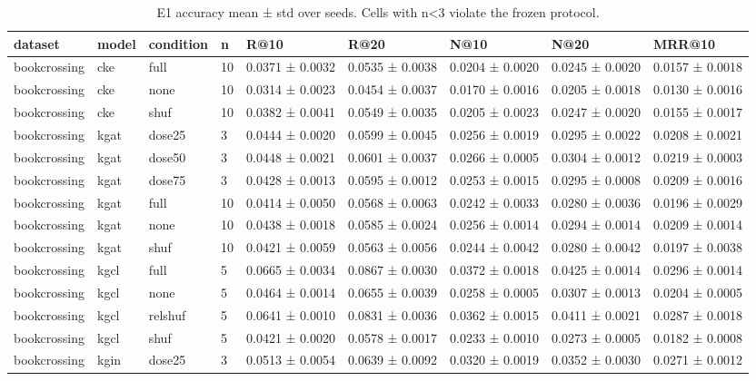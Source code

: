 \begin{table}[t]
\centering
\caption{E1 accuracy mean ± std over seeds. Cells with n<3 violate the frozen protocol.}
\label{tab:e1}
\begin{tabular}{lllllllll}
\hline
dataset & model & condition & n & R@10 & R@20 & N@10 & N@20 & MRR@10 \\
\hline
bookcrossing & cke & full & 10 & 0.0371 ± 0.0032 & 0.0535 ± 0.0038 & 0.0204 ± 0.0020 & 0.0245 ± 0.0020 & 0.0157 ± 0.0018 \\
bookcrossing & cke & none & 10 & 0.0314 ± 0.0023 & 0.0454 ± 0.0037 & 0.0170 ± 0.0016 & 0.0205 ± 0.0018 & 0.0130 ± 0.0016 \\
bookcrossing & cke & shuf & 10 & 0.0382 ± 0.0041 & 0.0549 ± 0.0035 & 0.0205 ± 0.0023 & 0.0247 ± 0.0020 & 0.0155 ± 0.0017 \\
bookcrossing & kgat & dose25 & 3 & 0.0444 ± 0.0020 & 0.0599 ± 0.0045 & 0.0256 ± 0.0019 & 0.0295 ± 0.0022 & 0.0208 ± 0.0021 \\
bookcrossing & kgat & dose50 & 3 & 0.0448 ± 0.0021 & 0.0601 ± 0.0037 & 0.0266 ± 0.0005 & 0.0304 ± 0.0012 & 0.0219 ± 0.0003 \\
bookcrossing & kgat & dose75 & 3 & 0.0428 ± 0.0013 & 0.0595 ± 0.0012 & 0.0253 ± 0.0015 & 0.0295 ± 0.0008 & 0.0209 ± 0.0016 \\
bookcrossing & kgat & full & 10 & 0.0414 ± 0.0050 & 0.0568 ± 0.0063 & 0.0242 ± 0.0033 & 0.0280 ± 0.0036 & 0.0196 ± 0.0029 \\
bookcrossing & kgat & none & 10 & 0.0438 ± 0.0018 & 0.0585 ± 0.0024 & 0.0256 ± 0.0014 & 0.0294 ± 0.0014 & 0.0209 ± 0.0014 \\
bookcrossing & kgat & shuf & 10 & 0.0421 ± 0.0059 & 0.0563 ± 0.0056 & 0.0244 ± 0.0042 & 0.0280 ± 0.0042 & 0.0197 ± 0.0038 \\
bookcrossing & kgcl & full & 5 & 0.0665 ± 0.0034 & 0.0867 ± 0.0030 & 0.0372 ± 0.0018 & 0.0425 ± 0.0014 & 0.0296 ± 0.0014 \\
bookcrossing & kgcl & none & 5 & 0.0464 ± 0.0014 & 0.0655 ± 0.0039 & 0.0258 ± 0.0005 & 0.0307 ± 0.0013 & 0.0204 ± 0.0005 \\
bookcrossing & kgcl & relshuf & 5 & 0.0641 ± 0.0010 & 0.0831 ± 0.0036 & 0.0362 ± 0.0015 & 0.0411 ± 0.0021 & 0.0287 ± 0.0018 \\
bookcrossing & kgcl & shuf & 5 & 0.0421 ± 0.0020 & 0.0578 ± 0.0017 & 0.0233 ± 0.0010 & 0.0273 ± 0.0005 & 0.0182 ± 0.0008 \\
bookcrossing & kgin & dose25 & 3 & 0.0513 ± 0.0054 & 0.0639 ± 0.0092 & 0.0320 ± 0.0019 & 0.0352 ± 0.0030 & 0.0271 ± 0.0012 \\

\end{tabular}
\end{table}

